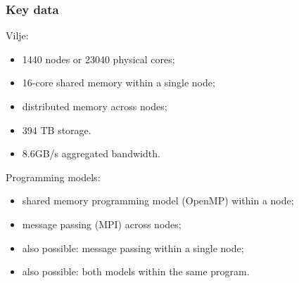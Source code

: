 \begin{frame}
  \frametitle{Key data}

  Vilje:
  \begin{itemize}
  \item 1440 nodes or 23040 physical cores;
  \item 16-core shared memory within a single node;
  \item distributed memory across nodes;
  \item 394 TB storage.
  \item 8.6GB/s aggregated bandwidth.
  \end{itemize}

  Programming models:
  \begin{itemize}
  \item shared memory programming model (OpenMP) within a node;
  \item message passing (MPI) across nodes;
  \item also possible: message passing within a single node;
  \item also possible: both models within the same program.
  \end{itemize}
\end{frame}



